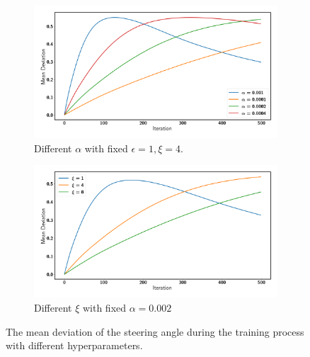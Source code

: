 
\clearpage

\null
\vfill

\begin{figure}[H]
    \centering

    \begin{subfigure}[b]{\textwidth}
        \includegraphics[width=\textwidth]{figures/chapter_driving/alpha.png}
        \caption{Different $\alpha$ with fixed $\epsilon=1, \xi=4$.}
        \label{fig:random}
    \end{subfigure}

    \begin{subfigure}[b]{\textwidth}
        \includegraphics[width=\textwidth]{figures/chapter_driving/xi.png}
        \caption{Different $\xi$ with fixed $\alpha=0.002$}
        \label{fig:left}
    \end{subfigure}

    \caption{The mean deviation of the steering angle during the training process with different hyperparameters.\label{figure_hyperparameters}}
\end{figure}

\vfill


